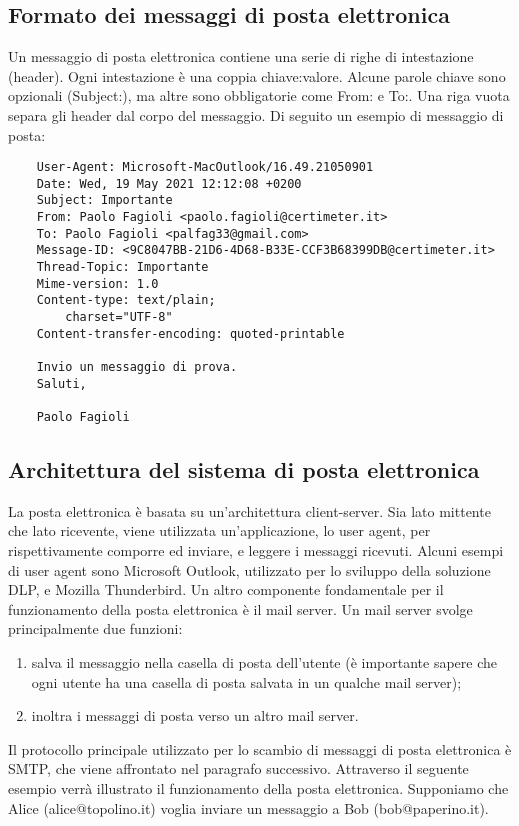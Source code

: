 \subsection{Formato dei messaggi di posta elettronica}
Un messaggio di posta elettronica contiene una serie di righe di intestazione (header).
Ogni intestazione è una coppia chiave:valore. Alcune parole chiave sono opzionali (Subject:), 
ma altre sono obbligatorie come From: e To:. Una riga vuota separa gli header dal corpo del messaggio.
Di seguito un esempio di messaggio di posta:

\begin{verbatim}
    User-Agent: Microsoft-MacOutlook/16.49.21050901
    Date: Wed, 19 May 2021 12:12:08 +0200
    Subject: Importante
    From: Paolo Fagioli <paolo.fagioli@certimeter.it>
    To: Paolo Fagioli <palfag33@gmail.com>
    Message-ID: <9C8047BB-21D6-4D68-B33E-CCF3B68399DB@certimeter.it>
    Thread-Topic: Importante
    Mime-version: 1.0
    Content-type: text/plain;
        charset="UTF-8"
    Content-transfer-encoding: quoted-printable

    Invio un messaggio di prova.
    Saluti,

    Paolo Fagioli
\end{verbatim}

\subsection{Architettura del sistema di posta elettronica}
La posta elettronica è basata su un'architettura client-server. 
Sia lato mittente che lato ricevente, viene utilizzata un'applicazione, lo user agent, per rispettivamente 
comporre ed inviare, e leggere i messaggi ricevuti. 
Alcuni esempi di user agent sono Microsoft Outlook, utilizzato per lo sviluppo della soluzione DLP, 
e Mozilla Thunderbird.
Un altro componente fondamentale per il funzionamento della posta elettronica è il mail server. 
Un mail server svolge principalmente due funzioni:

\begin{enumerate}
    \item salva il messaggio nella casella di posta dell'utente (è importante sapere che ogni utente ha una casella di posta salvata in un qualche mail server);
    \item inoltra i messaggi di posta verso un altro mail server.
\end{enumerate}

Il protocollo principale utilizzato per lo scambio di messaggi di posta elettronica è SMTP, 
che viene affrontato nel paragrafo successivo.
Attraverso il seguente esempio verrà illustrato il funzionamento della posta elettronica.
Supponiamo che Alice (alice@topolino.it) voglia inviare un messaggio a Bob (bob@paperino.it).

